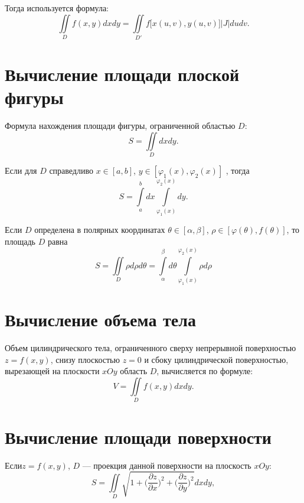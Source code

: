 \documentclass[a4paper,12pt,oneside]{extbook}
\theoremstyle{numbered}
\theoremstyle{unnumbered}
\theoremstyle{named}
\theoremstyle{unnumbered}
\theoremstyle{named}
\theoremstyle{named}
\theoremstyle{named}
\begin{document}
Тогда используется формула:
\begin{equation}
    \iint\limits_{D} f(x, y)dxdy = \iint\limits_{D'} f\big[ x(u, v), y(u, v) \big] |J| du dv.
\end{equation}

\section{Вычисление площади плоской фигуры}
\label{sec:Вычисление площади плоской фигуры}

Формула нахождения площади фигуры, ограниченной областью \(D\):
\begin{equation}
    S = \iint\limits_{D} dxdy.
\end{equation}

Если для \(D\) справедливо \(x \in [a, b]\), \(y \in [\varphi_1(x), \varphi_2(x)]\) , тогда
\begin{equation}
    S = \int\limits_{a}^{b} dx \int\limits_{\varphi_1(x)}^{\varphi_2(x)} dy.
\end{equation}

Если \(D\) определена в полярных координатах \(\theta \in [\alpha, \beta]\), \(\rho \in [\varphi(\theta), f(\theta)]\), то площадь \(D\) равна
\begin{equation}
    S = \iint\limits_{D} \rho d\rho d\theta = \int\limits_{\alpha}^{\beta} d\theta \int\limits_{\varphi_1(x)}^{\varphi_2(x)} \rho d\rho
\end{equation}

\section{Вычисление объема тела}
\label{sec:Вычисление объема тела}

Объем цилиндрического тела, ограниченного сверху непрерывной поверхностью \(z = f(x, y)\), снизу плоскостью \(z = 0\) и сбоку цилиндрической поверхностью, вырезающей на плоскости \(xOy\) область \(D\), вычисляется по формуле:
\begin{equation}
    V = \iint\limits_{D} f(x, y)dxdy.
\end{equation}

\section{Вычисление площади поверхности}
\label{sec:Вычисление площади поверхности}

Если\(z = f(x, y)\), \(D\) — проекция данной поверхности на плоскость \(xOy\):
\begin{equation}
    S = \iint\limits_{D} \sqrt{1 + \Big( \frac{\partial z}{\partial x} \Big)^2 + \Big( \frac{\partial z}{\partial y} \Big)^2} dxdy,
\end{equation}
\end{document}
